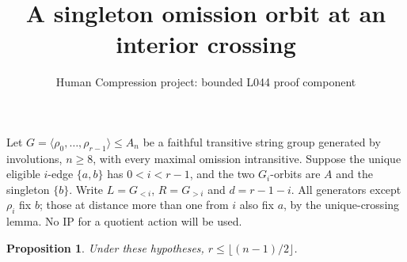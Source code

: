 \documentclass[11pt,a4paper]{article}
\title{A singleton omission orbit at an interior crossing}
\author{Human Compression project: bounded L044 proof component}
\date{}
\newtheorem{proposition}{Proposition}
\newcommand{\gen}[1]{\langle#1\rangle}
\begin{document}
\maketitle
Let $G=\gen{\rho_0,\ldots,\rho_{r-1}}\leq A_n$ be a faithful
transitive string group generated by involutions, $n\geq8$,
with every maximal omission intransitive. Suppose the unique
eligible $i$-edge $\{a,b\}$ has $0<i<r-1$, and the two
$G_i$-orbits are $A$ and the singleton $\{b\}$.
Write $L=G_{<i}$, $R=G_{>i}$ and $d=r-1-i$.
All generators except $\rho_i$ fix $b$; those at distance
more than one from $i$ also fix $a$, by the unique-crossing
lemma. No IP for a quotient action will be used.

\begin{proposition}
Under these hypotheses, $r\leq\lfloor(n-1)/2\rfloor$.
\end{proposition}
\end{document}
